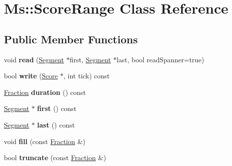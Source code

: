 \hypertarget{class_ms_1_1_score_range}{}\section{Ms\+:\+:Score\+Range Class Reference}
\label{class_ms_1_1_score_range}
\subsection*{Public Member Functions}
\begin{DoxyCompactItemize}
\item 
\mbox{\label{class_ms_1_1_score_range_a879e56859a215ff29283d7cb3271ac63}} 
void {\bfseries read} (\hyperlink{class_ms_1_1_segment}{Segment} $\ast$first, \hyperlink{class_ms_1_1_segment}{Segment} $\ast$last, bool read\+Spanner=true)
\item 
\mbox{\label{class_ms_1_1_score_range_a0770ea7d2afc457787b42bcc3a666453}} 
bool {\bfseries write} (\hyperlink{class_ms_1_1_score}{Score} $\ast$, int tick) const
\item 
\mbox{\label{class_ms_1_1_score_range_a91c28cade9d5214acca16502dccd6311}} 
\hyperlink{class_ms_1_1_fraction}{Fraction} {\bfseries duration} () const
\item 
\mbox{\label{class_ms_1_1_score_range_a6a8fc129e5a3f0c7c50a3c13e0e94d68}} 
\hyperlink{class_ms_1_1_segment}{Segment} $\ast$ {\bfseries first} () const
\item 
\mbox{\label{class_ms_1_1_score_range_ac7a1a49502ecb72e1b14b85e15262ec9}} 
\hyperlink{class_ms_1_1_segment}{Segment} $\ast$ {\bfseries last} () const
\item 
\mbox{\label{class_ms_1_1_score_range_a1162877a1551617e5d81d3110eba30e8}} 
void {\bfseries fill} (const \hyperlink{class_ms_1_1_fraction}{Fraction} \&)
\item 
\mbox{\label{class_ms_1_1_score_range_a3247e61f4dca8beead99eeefdaa84e86}} 
bool {\bfseries truncate} (const \hyperlink{class_ms_1_1_fraction}{Fraction} \&)
\end{DoxyCompactItemize}
